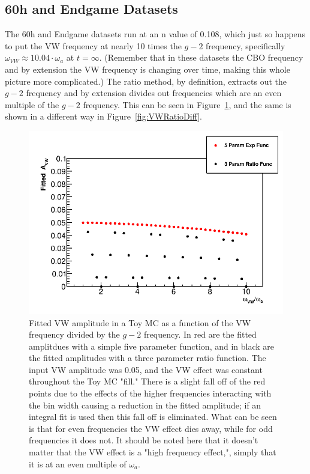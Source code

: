 \documentclass[12pt,letterpaper]{report}
\newcommand{\figref}[1]{Figure~\ref{#1}}
\def\gmtwo{$g-2$\xspace}
\def\wa{$\omega_{a}$\xspace}
\begin{document}
\subsection*{60h and Endgame Datasets}

The 60h and Endgame datasets run at an n value of 0.108, which just so happens to put the VW frequency at nearly 10 times the \gmtwo frequency, specifically $\omega_{VW} \approx 10.04 \cdot \omega_{a}$ at $t = \infty$. (Remember that in these datasets the CBO frequency and by extension the VW frequency is changing over time, making this whole picture more complicated.) The ratio method, by definition, extracts out the \gmtwo frequency and by extension divides out frequencies which are an even multiple of the \gmtwo frequency. This can be seen in \figref{fig:VW1x-10x}, and the same is shown in a different way in \figref{fig:VWRatioDiff}.


\begin{figure}[]
    \centering
    \includegraphics[width=\textwidth]{Fitted_Avw_Vs_Wvw_1x-10x}
    \caption[]{Fitted VW amplitude in a Toy MC as a function of the VW frequency divided by the \gmtwo frequency. In red are the fitted amplitdues with a simple five parameter function, and in black are the fitted amplitudes with a three parameter ratio function. The input VW amplitude was 0.05, and the VW effect was constant throughout the Toy MC "fill." There is a slight fall off of the red points due to the effects of the higher frequencies interacting with the bin width causing a reduction in the fitted amplitude; if an integral fit is used then this fall off is eliminated. What can be seen is that for even frequencies the VW effect dies away, while for odd frequencies it does not. It should be noted here that it doesn't matter that the VW effect is a "high frequency effect,", simply that it is at an even multiple of \wa.}
    \label{fig:VW1x-10x}
\end{figure}
\end{document}
